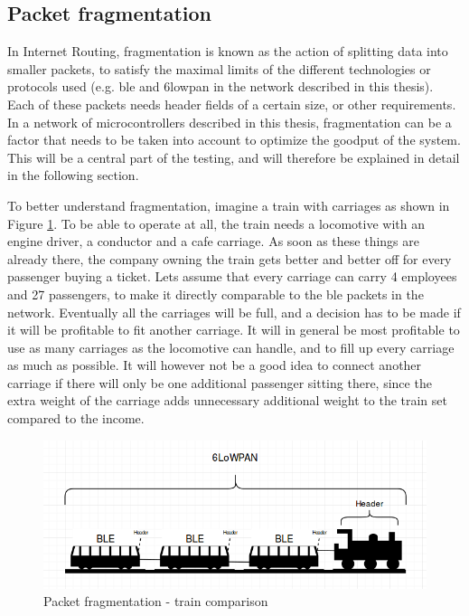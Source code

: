 \subsection{Packet fragmentation}

\noindent In Internet Routing, fragmentation is known as the action of splitting data into smaller packets, to satisfy the maximal limits of the different technologies or protocols used (e.g. \gls{ble} and \gls{6lowpan} in the network described in this thesis). Each of these packets needs header fields of a certain size, or other requirements. In a network of \glspl{microcontroller} described in this thesis, fragmentation can be a factor that needs to be taken into account to optimize the goodput of the system. This will be a central part of the testing, and will therefore be explained in detail in the following section. 

\noindent To better understand fragmentation, imagine a train with carriages as shown in Figure \ref{fig:trainExample}. To be able to operate at all, the train needs a locomotive with an engine driver, a conductor and a cafe carriage. As soon as these things are already there, the company owning the train gets better and better off for every passenger buying a ticket. Lets assume that every carriage can carry 4 employees and 27 passengers, to make it directly comparable to the \gls{ble} packets in the network. Eventually all the carriages will be full, and a decision has to be made if it will be profitable to fit another carriage. It will in general be most profitable to use as many carriages as the locomotive can handle, and to fill up every carriage as much as possible. It will however not be a good idea to connect another carriage if there will only be one additional passenger sitting there, since the extra weight of the carriage adds unnecessary additional weight to the train set compared to the income. 

\begin{figure}[ht]
    \centering
    \includegraphics[scale=0.5]{trainExample.png}    
    \caption{Packet fragmentation - train comparison}
    \label{fig:trainExample}
\end{figure}

